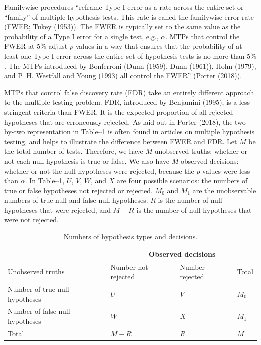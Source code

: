 \documentclass[
]{article}
\begin{document}
Familywise procedures ``reframe Type I error as a rate across the entire
set or ``family'' of multiple hypothesis tests. This rate is called the
familywise error rate (FWER; Tukey (1953)). The FWER is typically set to
the same value as the probability of a Type I error for a single test,
e.g., \(\alpha\). MTPs that control the FWER at \(5\%\) adjust
\(p\)-values in a way that ensures that the probability of at least one
Type I error across the entire set of hypothesis tests is no more than
\(5\%\). The MTPs introduced by Bonferroni (Dunn (1959), Dunn (1961)),
Holm (1979), and P. H. Westfall and Young (1993) all control the FWER''
(Porter (2018)).

MTPs that control false discovery rate (FDR) take an entirely different
approach to the multiple testing problem. FDR, introduced by Benjamini
(1995), is a less stringent criteria than FWER. It is the expected
proportion of all rejected hypotheses that are erroneously rejected. As
laid out in Porter (2018), the two-by-two representation in
Table\textasciitilde{}\ref{tab:twobytwo} is often found in articles on
multiple hypothesis testing, and helps to illustrate the difference
between FWER and FDR. Let \(M\) be the total number of tests. Therefore,
we have \(M\) unobserved truths: whether or not each null hypothesis is
true or false. We also have \(M\) observed decisions: whether or not the
null hypotheses were rejected, because the \(p\)-values were less than
\(\alpha\). In Table\textasciitilde{}\ref{tab:twobytwo}, \(U\), \(V\),
\(W\), and \(X\) are four possible scenarios: the numbers of true or
false hypotheses not rejected or rejected. \(M_0\) and \(M_1\) are the
unobservable numbers of true null and false null hypotheses. \(R\) is
the number of null hypotheses that were rejected, and \(M - R\) is the
number of null hypotheses that were not rejected.

\begin{table}[h!]
\centering
\begin{tabular}{l l l l}
                                      & \multicolumn{3}{c}{Observed decisions}\\ \hline
Unobserved truths                     & Number not rejected     & Number rejected   & Total \\ \hline
Number of true null hypotheses        & $U$                     & $V$               & $M_0$ \\
Number of false null hypotheses       & $W$                     & $X$               & $M_1$ \\ \hline
Total                                 & $M-R$                   & $R$               & $M$
\end{tabular}
\caption{Numbers of hypothesis types and decisions.}
  \label{tab:twobytwo}
\end{table}
\end{document}

